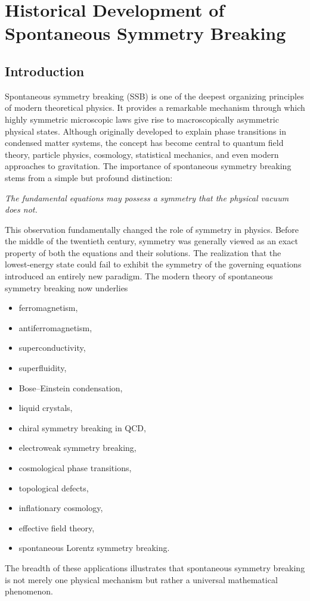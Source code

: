 \chapter{Historical Development of Spontaneous Symmetry Breaking}
\label{chap:history}
\section{Introduction}
Spontaneous symmetry breaking (SSB) is one of the deepest organizing
principles of modern theoretical physics. It provides a remarkable
mechanism through which highly symmetric microscopic laws give rise to
macroscopically asymmetric physical states. Although originally developed
to explain phase transitions in condensed matter systems, the concept has
become central to quantum field theory, particle physics, cosmology,
statistical mechanics, and even modern approaches to gravitation.
The importance of spontaneous symmetry breaking stems from a simple but
profound distinction:
\begin{center}
\emph{The fundamental equations may possess a symmetry that the physical
vacuum does not.}
\end{center}
This observation fundamentally changed the role of symmetry in physics.
Before the middle of the twentieth century, symmetry was generally viewed
as an exact property of both the equations and their solutions.
The realization that the lowest-energy state could fail to exhibit the
symmetry of the governing equations introduced an entirely new paradigm.
The modern theory of spontaneous symmetry breaking now underlies
\begin{itemize}
\item ferromagnetism,
\item antiferromagnetism,
\item superconductivity,
\item superfluidity,
\item Bose--Einstein condensation,
\item liquid crystals,
\item chiral symmetry breaking in QCD,
\item electroweak symmetry breaking,
\item cosmological phase transitions,
\item topological defects,
\item inflationary cosmology,
\item effective field theory,
\item spontaneous Lorentz symmetry breaking.
\end{itemize}
The breadth of these applications illustrates that spontaneous symmetry
breaking is not merely one physical mechanism but rather a universal
mathematical phenomenon.

